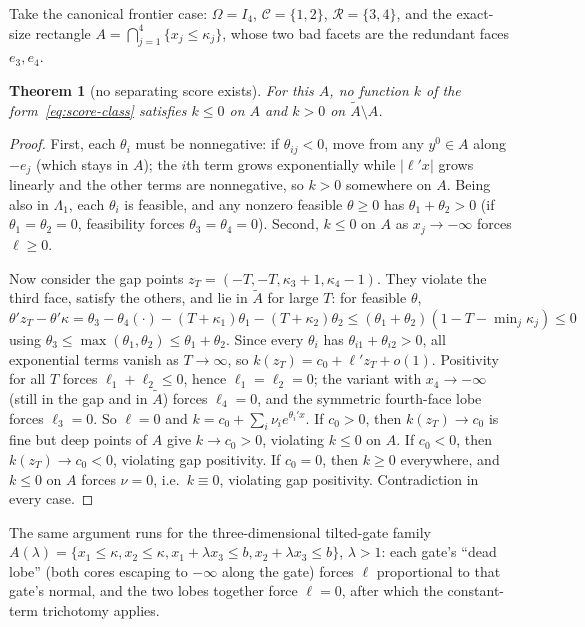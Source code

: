 \documentclass[12pt]{article}
\newtheorem{thmc}[lemc]{Theorem}
\theoremstyle{remark}
\newcommand{\cC}{\mathcal C}
\newcommand{\cR}{\mathcal R}
\newcommand{\wt}{\widetilde}
\begin{document}
Take the canonical frontier case: $\Omega=I_4$, $\cC=\{1,2\}$,
$\cR=\{3,4\}$, and the exact-size rectangle
$A=\bigcap_{j=1}^4\{x_j\le\kappa_j\}$, whose two bad facets are the
redundant faces $e_3,e_4$.

\begin{thmc}[no separating score exists]\label{thm:barrier}
For this $A$, no function $k$ of the form~\eqref{eq:score-class} satisfies
$k\le0$ on $A$ and $k>0$ on $\wt A\setminus A$.
\end{thmc}

\begin{proof}
First, each $\theta_i$ must be nonnegative: if $\theta_{ij}<0$, move from
any $y^0\in A$ along $-e_j$ (which stays in $A$); the $i$th term grows
exponentially while $|\ell'x|$ grows linearly and the other terms are
nonnegative, so $k>0$ somewhere on $A$. Being also in $\Lambda_1$, each
$\theta_i$ is feasible, and any nonzero feasible $\theta\ge0$ has
$\theta_1+\theta_2>0$ (if $\theta_1=\theta_2=0$, feasibility forces
$\theta_3=\theta_4=0$). Second, $k\le0$ on $A$ as $x_j\to-\infty$ forces
$\ell\ge0$.

Now consider the gap points $z_T=(-T,-T,\kappa_3+1,\kappa_4-1)$. They
violate the third face, satisfy the others, and lie in $\wt A$ for large
$T$: for feasible $\theta$,
$\theta'z_T-\theta'\kappa
=\theta_3-\theta_4(\cdot)-(T+\kappa_1)\theta_1-(T+\kappa_2)\theta_2
\le(\theta_1+\theta_2)(1-T-\min_j\kappa_j)\le0$
using $\theta_3\le\max(\theta_1,\theta_2)\le\theta_1+\theta_2$. Since every
$\theta_i$ has $\theta_{i1}+\theta_{i2}>0$, all exponential terms vanish as
$T\to\infty$, so $k(z_T)=c_0+\ell'z_T+o(1)$. Positivity for all $T$ forces
$\ell_1+\ell_2\le0$, hence $\ell_1=\ell_2=0$; the variant with
$x_4\to-\infty$ (still in the gap and in $\wt A$) forces $\ell_4=0$, and
the symmetric fourth-face lobe forces $\ell_3=0$. So $\ell=0$ and
$k=c_0+\sum_i\nu_ie^{\theta_i'x}$. If $c_0>0$, then $k(z_T)\to c_0$ is fine
but deep points of $A$ give $k\to c_0>0$, violating $k\le0$ on $A$. If
$c_0<0$, then $k(z_T)\to c_0<0$, violating gap positivity. If $c_0=0$, then
$k\ge0$ everywhere, and $k\le0$ on $A$ forces $\nu=0$, i.e.\ $k\equiv0$,
violating gap positivity. Contradiction in every case.
\end{proof}

The same argument runs for the three-dimensional tilted-gate family
$A(\lambda)=\{x_1\le\kappa,x_2\le\kappa,x_1+\lambda x_3\le b,
x_2+\lambda x_3\le b\}$, $\lambda>1$: each gate's ``dead lobe'' (both cores
escaping to $-\infty$ along the gate) forces $\ell$ proportional to that
gate's normal, and the two lobes together force $\ell=0$, after which the
constant-term trichotomy applies.
\end{document}
